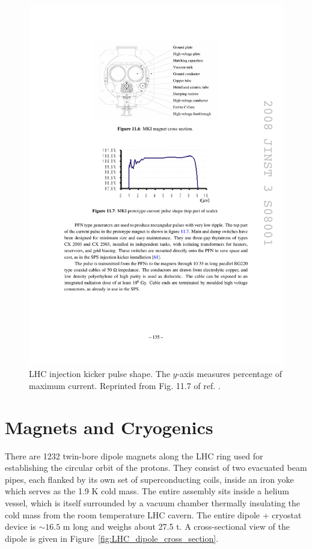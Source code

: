 \documentclass[dissertation.tex]{subfiles}
\begin{document}
\begin{figure}
	\centering
	\includegraphics[scale=1.0]{MKI_pulse}
	\caption{LHC injection kicker pulse shape.  The $y$-axis measures percentage of maximum current.  Reprinted from Fig. 11.7 of ref. \cite{LHC_paper}.}
	\label{fig:MKI_pulse}
\end{figure}

\section{Magnets and Cryogenics}
\label{sec:Magnets and Cryogenics}

There are 1232 twin-bore dipole magnets along the LHC ring used for establishing the circular orbit of the protons.  They consist of two evacuated beam pipes, each flanked by its own set of superconducting coils, inside an iron yoke which serves as the 1.9 K cold mass.  The entire assembly sits inside a helium vessel, which is itself surrounded by a vacuum chamber thermally insulating the cold mass from the room temperature LHC cavern.  The entire dipole + cryostat device is $\sim16.5$ m long and weighs about 27.5 t.  A cross-sectional view of the dipole is given in Figure~\ref{fig:LHC_dipole_cross_section}.
\end{document}
